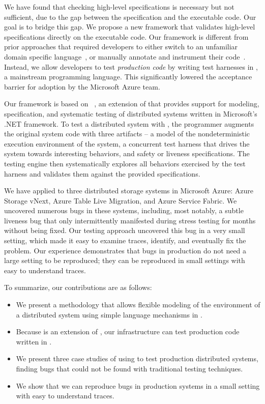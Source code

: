 We have found that checking high-level specifications is necessary but not sufficient, due to the gap between the specification and the executable code. Our goal is to bridge this gap. We propose a new framework that validates high-level specifications directly on the executable code. Our framework is different from prior approaches that required developers to either switch to an unfamiliar domain specific language~\cite{killian2007life, desai2015building}, or manually annotate and instrument their code~\cite{}. Instead, we allow developers to test \emph{production code} by writing test harnesses in \csharp, a mainstream programming language. This significantly lowered the acceptance barrier for adoption by the Microsoft Azure team.

Our framework is based on \psharp~\cite{deligiannis2015psharp}, an extension of \csharp that provides support for modeling, specification, and systematic testing of distributed systems written in Microsoft's .NET framework.
To test a distributed system with \psharp, the programmer augments the original system code with three artifacts -- a model of the nondeterministic execution environment of the system, a concurrent test harness that drives the system towards interesting behaviors, and safety or liveness specifications.
The \psharp testing engine then systematically explores all behaviors exercised by the test harness and validates them against the provided specifications.

We have applied \psharp to three distributed storage systems in Microsoft Azure: Azure Storage vNext, Azure Table Live Migration, and Azure Service Fabric.
We uncovered numerous bugs in these systems, including, most notably, a subtle liveness bug that only intermittently 
manifested during stress testing for months without being fixed.
Our testing approach uncovered this bug in a very small setting, which made it easy to examine traces, identify, and eventually fix the problem.
Our experience demonstrates that bugs in production do not need a large setting to be reproduced;
they can be reproduced in small settings with easy to understand traces.

To summarize, our contributions are as follows:
\begin{itemize}
\item We present a methodology that allows flexible modeling of the environment of a distributed system using simple language mechanisms in \psharp.
\item Because \psharp is an extension of \csharp, our infrastructure can test production code written in \csharp.
\item We present three case studies of using \psharp to test production distributed systems, finding bugs that could not be found with traditional testing techniques.
\item We show that we can reproduce bugs in production systems in a small setting with easy to understand traces.
\end{itemize}

